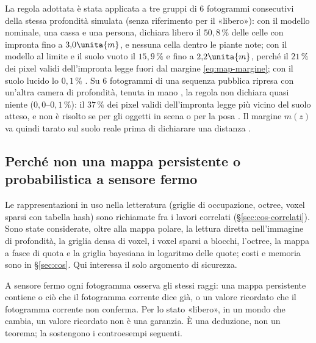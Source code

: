 La regola adottata è stata applicata a tre gruppi di 6 fotogrammi consecutivi della stessa profondità simulata (senza riferimento per il «libero»): con il modello nominale, una cassa e una persona, dichiara libero il $50{,}8\,\%$ delle celle con impronta fino a $3{,}0\unita{m}$, e nessuna cella dentro le piante note; con il modello al limite e il suolo vuoto il $15{,}9\,\%$ e fino a $2{,}2\unita{m}$, perché il $21\,\%$ dei pixel validi dell'impronta legge fuori dal margine \eqref{eq:map-margine}; con il suolo lucido lo $0{,}1\,\%$ . Su 6 fotogrammi di una sequenza pubblica ripresa con un'altra camera di profondità, tenuta in mano \cite{tum-rgbd}, la regola non dichiara quasi niente ($0{,}0$–$0{,}1\,\%$): il $37\,\%$ dei pixel validi dell'impronta legge più vicino del suolo atteso, e non è risolto se per gli oggetti in scena o per la posa . Il margine $m(z)$ va quindi tarato sul suolo reale prima di dichiarare una distanza .

\subsection{Perché non una mappa persistente o probabilistica a sensore fermo}\label{sec:map-persistente}

Le rappresentazioni in uso nella letteratura (griglie di occupazione, octree, voxel sparsi con tabella hash) sono richiamate fra i lavori correlati (\S\ref{sec:cos-correlati}). Sono state considerate, oltre alla mappa polare, la lettura diretta nell'immagine di profondità, la griglia densa di voxel, i voxel sparsi a blocchi, l'octree, la mappa a fasce di quota e la griglia bayesiana in logaritmo delle quote; costi e memoria sono in \S\ref{sec:cos}. Qui interessa il solo argomento di sicurezza.

\begin{osservazione}\label{oss:map-fermo}
A sensore fermo ogni fotogramma osserva gli stessi raggi: una mappa persistente contiene o ciò che il fotogramma corrente dice già, o un valore ricordato che il fotogramma corrente non conferma. Per lo stato «libero», in un mondo che cambia, un valore ricordato non è una garanzia. È una deduzione, non un teorema; la sostengono i controesempi seguenti.
\end{osservazione}

